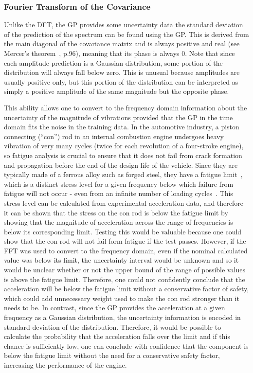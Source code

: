 \documentclass[12pt]{article}
\begin{document}
    \subsubsection{Fourier Transform of the Covariance}
    Unlike the DFT, the GP provides some uncertainty data the standard deviation of the prediction of the spectrum can be found using the GP\@.
    This is derived from the main diagonal of the covariance matrix and is always positive and real (see Mercer's theorem~\cite{rasmussen2006gaussian}, p.96), meaning that its phase is always 0.
    Note that since each amplitude prediction is a Gaussian distribution, some portion of the distribution will always fall below zero.
    This is unusual because amplitudes are usually positive only, but this portion of the distribution can be interpreted as simply a positive amplitude of the same magnitude but the opposite phase.

    This ability allows one to convert to the frequency domain information about the uncertainty of the magnitude of vibrations provided that the GP in the time domain fits the noise in the training data.
    In the automotive industry, a piston connecting (``con'') rod in an internal combustion engine undergoes heavy vibration of very many cycles (twice for each revolution of a four-stroke engine), so fatigue analysis is crucial to ensure that it does not fail from crack formation and propagation before the end of the design life of the vehicle.
    Since they are typically made of a ferrous alloy such as forged steel, they have a fatigue limit~\cite{RoymechFatigue}, which is a distinct stress level for a given frequency below which failure from fatigue will not occur - even from an infinite number of loading cycles~\cite{BeerJohnston1992}.
    This stress level can be calculated from experimental acceleration data, and therefore it can be shown that the stress on the con rod is below the fatigue limit by showing that the magnitude of acceleration across the range of frequencies is below its corresponding limit.
    Testing this would be valuable because one could show that the con rod will not fail form fatigue if the test passes.
    However, if the FFT was used to convert to the frequency domain, even if the nominal calculated value was below its limit, the uncertainty interval would be unknown and so it would be unclear whether or not the upper bound of the range of possible values is above the fatigue limit.
    Therefore, one could not confidently conclude that the acceleration will be below the fatigue limit without a conservative factor of safety, which could add unnecessary weight used to make the con rod stronger than it needs to be.
    In contrast, since the GP provides the acceleration at a given frequency as a Gaussian distribution, the uncertainty information is encoded in standard deviation of the distribution.
    Therefore, it would be possible to calculate the probability that the acceleration falls over the limit and if this chance is sufficiently low, one can conclude with confidence that the component is below the fatigue limit without the need for a conservative safety factor, increasing the performance of the engine.
\end{document}
